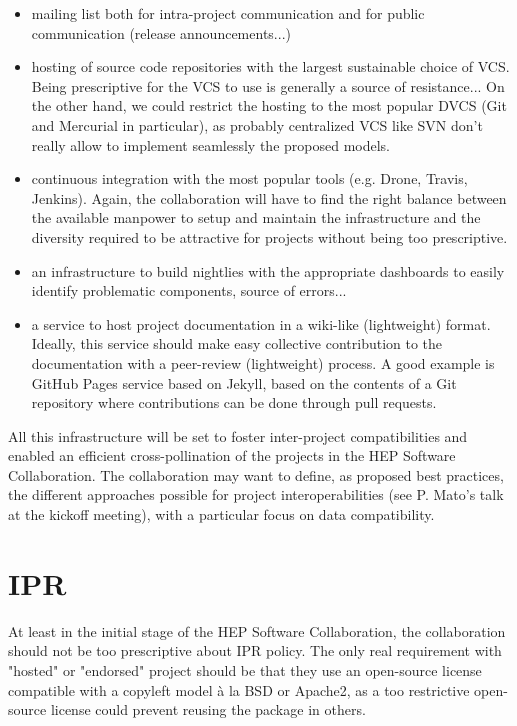 \documentclass[11pt]{article} %
\begin{document}
\begin{itemize}

\item mailing list both for intra-project communication and for public communication (release announcements...)

\item hosting of source code repositories with the largest sustainable choice of VCS. Being prescriptive for the VCS
to use is generally a source of resistance... On the other hand, we could restrict the hosting to the most popular DVCS
(Git and Mercurial in particular), as probably centralized VCS like SVN don't really allow to implement seamlessly the
proposed models.

\item continuous integration with the most popular tools (e.g. Drone, Travis, Jenkins). Again, the collaboration will
have to find the right balance between the available manpower to setup and maintain the infrastructure and the diversity
required to be attractive for projects without being too prescriptive.

\item an infrastructure to build nightlies with the appropriate dashboards to easily identify problematic components,
source of errors...

\item a service to host project documentation in a wiki-like (lightweight) format. Ideally, this
service should make easy collective contribution to the documentation with a peer-review (lightweight) process. A good example
is GitHub Pages service based on Jekyll, based on the contents of a Git repository where contributions can be done through pull
requests.

\end{itemize}

All this infrastructure will be set to foster inter-project compatibilities and enabled an efficient cross-pollination of
the projects in the HEP Software Collaboration. The collaboration may want to define, as proposed best practices, the different
approaches possible for project interoperabilities (see P. Mato's talk at the kickoff meeting), with a particular focus on
data compatibility.


\section{IPR}

At least in the initial stage of the HEP Software Collaboration, the collaboration should not be too prescriptive about IPR policy.
The only real requirement with "hosted" or "endorsed" project should be that they use an open-source license compatible with a
copyleft model à la BSD or Apache2, as a too restrictive open-source license could prevent reusing the package in others.
\end{document}
